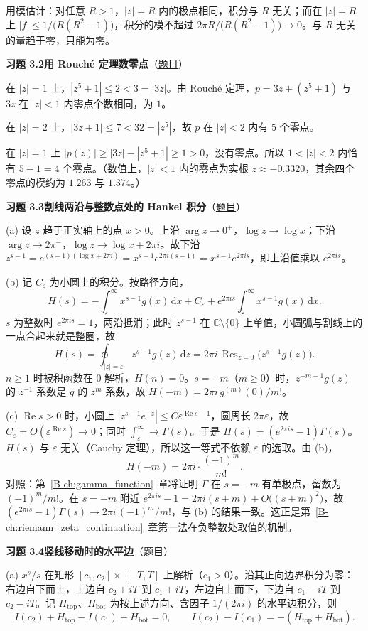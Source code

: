 \documentclass[11pt,a4paper]{article}
\DeclareMathOperator{\Res}{Res}
\newcommand{\CC}{\mathbb{C}}
\newcommand{\dd}{\,\mathrm{d}}
\renewcommand{\Re}{\operatorname{Re}}
\newcommand{\bref}[1]{\ref*{B-#1}}
\newcommand{\Sol}[2]{%
  \par\addvspace{1.2em}\noindent
  \hypertarget{s:#1}{}\textbf{习题 #1\quad #2}\hfill{\small（\hyperlink{q:#1}{题目}）}\par
  \nopagebreak\smallskip}
\begin{document}
用模估计：对任意 $R>1$，$|z|=R$ 内的极点相同，积分与 $R$ 无关；而在 $|z|=R$ 上 $|f|\le1/\bigl(R(R^2-1)\bigr)$，积分的模不超过 $2\pi R/\bigl(R(R^2-1)\bigr)\to0$。与 $R$ 无关的量趋于零，只能为零。

\Sol{3.2}{用 Rouché 定理数零点}
在 $|z|=1$ 上，$|z^5+1|\le2<3=|3z|$。由 Rouché 定理，$p=3z+(z^5+1)$ 与 $3z$ 在 $|z|<1$ 内零点个数相同，为 $1$。

在 $|z|=2$ 上，$|3z+1|\le7<32=|z^5|$，故 $p$ 在 $|z|<2$ 内有 $5$ 个零点。

在 $|z|=1$ 上 $|p(z)|\ge|3z|-|z^5+1|\ge1>0$，没有零点。所以 $1<|z|<2$ 内恰有 $5-1=4$ 个零点。（数值上，$|z|<1$ 内的零点为实根 $z\approx-0.3320$，其余四个零点的模约为 $1.263$ 与 $1.374$。）

\Sol{3.3}{割线两沿与整数点处的 Hankel 积分}
(a) 设 $z$ 趋于正实轴上的点 $x>0$。上沿 $\arg z\to0^+$，$\log z\to\log x$；下沿 $\arg z\to2\pi^-$，$\log z\to\log x+2\pi i$。故下沿
$z^{s-1}=e^{(s-1)(\log x+2\pi i)}=x^{s-1}e^{2\pi i(s-1)}=x^{s-1}e^{2\pi is}$，即上沿值乘以 $e^{2\pi is}$。

(b) 记 $C_\varepsilon$ 为小圆上的积分。按路径方向，
\[
  H(s)=-\int_\varepsilon^\infty x^{s-1}g(x)\dd x+C_\varepsilon+e^{2\pi is}\int_\varepsilon^\infty x^{s-1}g(x)\dd x .
\]
$s$ 为整数时 $e^{2\pi is}=1$，两沿抵消；此时 $z^{s-1}$ 在 $\CC\setminus\{0\}$ 上单值，小圆弧与割线上的一点合起来就是整圈，故
\[
  H(s)=\oint_{|z|=\varepsilon}z^{s-1}g(z)\dd z=2\pi i\,\Res_{z=0}\bigl(z^{s-1}g(z)\bigr).
\]
$n\ge1$ 时被积函数在 $0$ 解析，$H(n)=0$。$s=-m$（$m\ge0$）时，$z^{-m-1}g(z)$ 的 $z^{-1}$ 系数是 $g$ 的 $z^m$ 系数，故 $H(-m)=2\pi i\,g^{(m)}(0)/m!$。

(c) $\Re s>0$ 时，小圆上 $|z^{s-1}e^{-z}|\le C\varepsilon^{\Re s-1}$，圆周长 $2\pi\varepsilon$，故 $C_\varepsilon=O(\varepsilon^{\Re s})\to0$；同时 $\int_\varepsilon^\infty\to\Gamma(s)$。于是 $H(s)=(e^{2\pi is}-1)\Gamma(s)$。$H(s)$ 与 $\varepsilon$ 无关（Cauchy 定理），所以这一等式不依赖 $\varepsilon$ 的选取。由 (b)，
\[
  H(-m)=2\pi i\cdot\frac{(-1)^m}{m!}.
\]
对照：第~\bref{ch:gamma_function}~章将证明 $\Gamma$ 在 $s=-m$ 有单极点，留数为 $(-1)^m/m!$。在 $s=-m$ 附近 $e^{2\pi is}-1=2\pi i(s+m)+O\bigl((s+m)^2\bigr)$，故 $(e^{2\pi is}-1)\Gamma(s)\to2\pi i\,(-1)^m/m!$，与 (b) 的结果一致。这正是第~\bref{ch:riemann_zeta_continuation}~章第一法在负整数处取值的机制。

\Sol{3.4}{竖线移动时的水平边}
(a) $x^s/s$ 在矩形 $[c_1,c_2]\times[-T,T]$ 上解析（$c_1>0$）。沿其正向边界积分为零：右边自下而上，上边自 $c_2+iT$ 到 $c_1+iT$，左边自上而下，下边自 $c_1-iT$ 到 $c_2-iT$。记 $H_{\mathrm{top}}$、$H_{\mathrm{bot}}$ 为按上述方向、含因子 $1/(2\pi i)$ 的水平边积分，则
\[
  I(c_2)+H_{\mathrm{top}}-I(c_1)+H_{\mathrm{bot}}=0,\qquad I(c_2)-I(c_1)=-(H_{\mathrm{top}}+H_{\mathrm{bot}}).
\]
\end{document}
